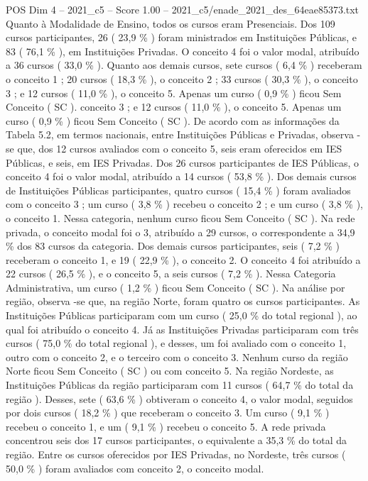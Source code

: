\begin{textsample}{POS Dim 4 – 2021\_c5 – Score 1.00 – 2021\_c5/enade\_2021\_des\_64eae85373.txt}
Quanto à Modalidade de Ensino, todos os cursos eram Presenciais.
Dos 109 cursos participantes, 26 ( 23,9 \% ) foram ministrados em Instituições Públicas, e 83 ( 76,1 \% ), em Instituições Privadas.
O conceito 4 foi o valor modal, atribuído a 36 cursos ( 33,0 \% ).
Quanto aos demais cursos, sete cursos ( 6,4 \% ) receberam o conceito 1 ; 20 cursos ( 18,3 \% ), o conceito 2 ; 33 cursos ( 30,3 \% ), o conceito 3 ; e 12 cursos ( 11,0 \% ), o conceito 5.
Apenas um curso ( 0,9 \% ) ficou Sem Conceito ( SC ). conceito 3 ; e 12 cursos ( 11,0 \% ), o conceito 5.
Apenas um curso ( 0,9 \% ) ficou Sem Conceito ( SC ).
De acordo com as informações da Tabela 5.2, em termos nacionais, entre Instituições Públicas e Privadas, observa -se que, dos 12 cursos avaliados com o conceito 5, seis eram oferecidos em IES Públicas, e seis, em IES Privadas.
Dos 26 cursos participantes de IES Públicas, o conceito 4 foi o valor modal, atribuído a 14 cursos ( 53,8 \% ).
Dos demais cursos de Instituições Públicas participantes, quatro cursos ( 15,4 \% ) foram avaliados com o conceito 3 ; um curso ( 3,8 \% ) recebeu o conceito 2 ; e um curso ( 3,8 \% ), o conceito 1.
Nessa categoria, nenhum curso ficou Sem Conceito ( SC ).
Na rede privada, o conceito modal foi o 3, atribuído a 29 cursos, o correspondente a 34,9 \% dos 83 cursos da categoria.
Dos demais cursos participantes, seis ( 7,2 \% ) receberam o conceito 1, e 19 ( 22,9 \% ), o conceito 2.
O conceito 4 foi atribuído a 22 cursos ( 26,5 \% ), e o conceito 5, a seis cursos ( 7,2 \% ).
Nessa Categoria Administrativa, um curso ( 1,2 \% ) ficou Sem Conceito ( SC ).
Na análise por região, observa -se que, na região Norte, foram quatro os cursos participantes.
As Instituições Públicas participaram com um curso ( 25,0 \% do total regional ), ao qual foi atribuído o conceito 4.
Já as Instituições Privadas participaram com três cursos ( 75,0 \% do total regional ), e desses, um foi avaliado com o conceito 1, outro com o conceito 2, e o terceiro com o conceito 3.
Nenhum curso da região Norte ficou Sem Conceito ( SC ) ou com conceito 5.
Na região Nordeste, as Instituições Públicas da região participaram com 11 cursos ( 64,7 \% do total da região ).
Desses, sete ( 63,6 \% ) obtiveram o conceito 4, o valor modal, seguidos por dois cursos ( 18,2 \% ) que receberam o conceito 3.
Um curso ( 9,1 \% ) recebeu o conceito 1, e um ( 9,1 \% ) recebeu o conceito 5.
A rede privada concentrou seis dos 17 cursos participantes, o equivalente a 35,3 \% do total da região.
Entre os cursos oferecidos por IES Privadas, no Nordeste, três cursos ( 50,0 \% ) foram avaliados com conceito 2, o conceito modal.

\end{textsample}
